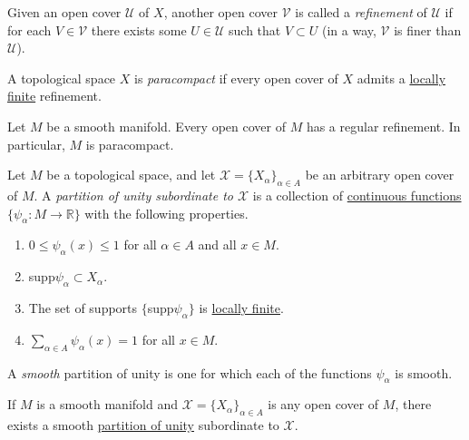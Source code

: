 \documentclass{article}
\newcounter{theorem}[section]
\newcounter{definition}[section]
\begin{document}
      \begin{definition}[Refinement]
        \label{def:refinement}
        Given an open cover $\mathcal{U}$ of $X$, another open cover $\mathcal{V}$ is called a \textit{refinement} of $\mathcal{U}$ if for each $V \in \mathcal{V}$ there exists some $U \in \mathcal{U}$ such that $V \subset U$ (in a way, $\mathcal{V}$ is finer than $\mathcal{U}$).  
      \end{definition}

      \begin{definition}[Paracompact]
        \label{def:paracompact}
        A topological space $X$ is \textit{paracompact} if every open cover of $X$ admits a \hyperref[def:locally-finite]{locally finite} refinement. 
      \end{definition}

      \begin{theorem}
        \label{thm:smooth-manifolds-are-paracompact}
        Let $M$ be a smooth manifold. Every open cover of $M$ has a regular refinement. In particular, $M$ is paracompact. 
      \end{theorem}

      \begin{definition}
        \label{def:partition-of-unity}
        Let $M$ be a topological space, and let $\mathcal{X} = \{X_\alpha\}_{\alpha \in A}$ be an arbitrary open cover of $M$. A \textit{partition of unity subordinate to $\mathcal{X}$} is a collection of \hyperref[pst-def:continuous_func]{continuous functions} $\{ \psi_\alpha: M \to \mathbb{R}\}$ with the following properties. 
        \begin{enumerate}
          \item $0 \leq \psi_\alpha (x) \leq 1$ for all $\alpha \in A$ and all $x \in M$. 
          \item supp$\psi_\alpha \subset X_\alpha$. 
          \item The set of supports $\{$supp$\psi_\alpha\}$ is \hyperref[def:locally-finite]{locally finite}. 
          \item $\sum_{\alpha \in A} \psi_\alpha (x) = 1$ for all $x \in M$. 
        \end{enumerate}
        A \textit{smooth} partition of unity is one for which each of the functions $\psi_\alpha$ is smooth. 
      \end{definition}

      \begin{theorem}
        \label{thm:existence-of-partitions-of-unity}
        If $M$ is a smooth manifold and $\mathcal{X} = \{X_\alpha\}_{\alpha \in A}$ is any open cover of $M$, there exists a smooth \hyperref[def:partition-of-unity]{partition of unity} subordinate to $\mathcal{X}$. 
      \end{theorem}
\end{document}
